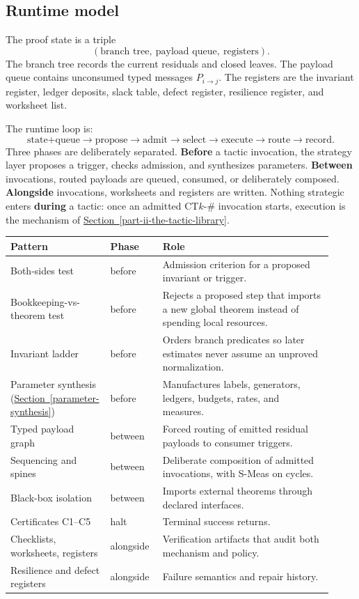 \documentclass[
  11pt,
]{article}
\theoremstyle{definition}
\newcommand{\secref}[1]{\hyperref[#1]{Section~\ref*{#1}}}
\begin{document}
\subsection{Runtime model}\label{runtime-model}

The proof state is a triple
\[
(\text{branch tree},\ \text{payload queue},\ \text{registers}).
\]
The branch tree records the current residuals and closed leaves. The
payload queue contains unconsumed typed messages \(P_{i\to j}\). The
registers are the invariant register, ledger deposits, slack table,
defect register, resilience register, and worksheet list.

The runtime loop is:
\[
\text{state+queue}\to\text{propose}\to\text{admit}\to\text{select}
\to\text{execute}\to\text{route}\to\text{record}.
\]
Three phases are deliberately separated. \textbf{Before} a tactic
invocation, the strategy layer proposes a trigger, checks admission, and
synthesizes parameters. \textbf{Between} invocations, routed payloads are
queued, consumed, or deliberately composed. \textbf{Alongside}
invocations, worksheets and registers are written. Nothing strategic
enters \textbf{during} a tactic: once an admitted CT\(k\)-\(\#\)
invocation starts, execution is the mechanism of \secref{part-ii-the-tactic-library}.

\begingroup
\small
\setlength{\tabcolsep}{2pt}
\begin{longtable}[]{@{}
  >{\raggedright\arraybackslash}p{0.24\linewidth}
  >{\raggedright\arraybackslash}p{0.16\linewidth}
  >{\raggedright\arraybackslash}p{0.52\linewidth}@{}}
\toprule\noalign{}
Pattern & Phase & Role \\
\midrule\noalign{}
\endhead
\bottomrule\noalign{}
\endlastfoot
Both-sides test & before & Admission criterion for a proposed invariant or trigger. \\
Bookkeeping-vs-theorem test & before & Rejects a proposed step that imports a new global theorem instead of spending local resources. \\
Invariant ladder & before & Orders branch predicates so later estimates never assume an unproved normalization. \\
Parameter synthesis (\secref{parameter-synthesis}) & before & Manufactures labels, generators, ledgers, budgets, rates, and measures. \\
Typed payload graph & between & Forced routing of emitted residual payloads to consumer triggers. \\
Sequencing and spines & between & Deliberate composition of admitted invocations, with S-Meas on cycles. \\
Black-box isolation & between & Imports external theorems through declared interfaces. \\
Certificates C1--C5 & halt & Terminal success returns. \\
Checklists, worksheets, registers & alongside & Verification artifacts that audit both mechanism and policy. \\
Resilience and defect registers & alongside & Failure semantics and repair history. \\
\end{longtable}
\endgroup
\end{document}
